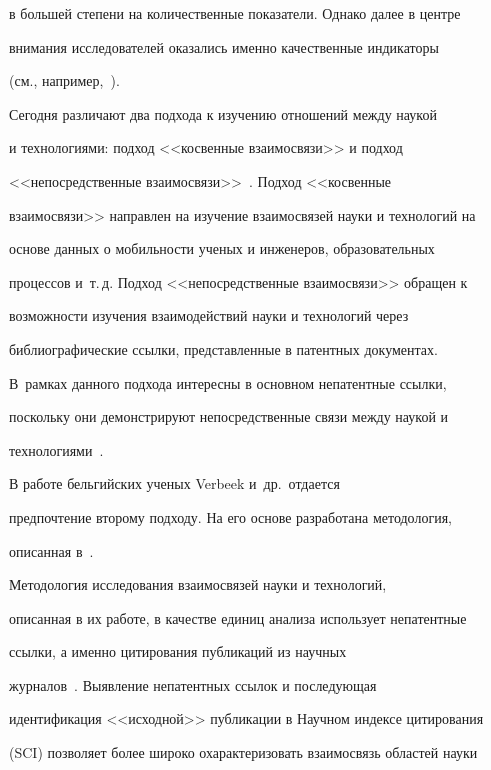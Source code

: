 в большей степени на количественные показатели. Однако далее в центре 


внимания исследователей оказались именно качественные индикаторы 


(см., например,~\cite{14-koz}).


     


     Сегодня различают два подхода к изучению отношений между наукой 


и технологиями: подход <<косвенные взаимосвязи>> и подход 


<<непосредственные взаимосвязи>>~\cite{2-koz}. Подход <<косвенные 


взаимосвязи>> направлен на изучение взаимосвязей науки и технологий на 


основе данных о мобильности ученых и инженеров, образовательных 


процессов и~т.\,д. Подход <<непосредственные взаимосвязи>> обращен к 


возможности изучения взаимодействий науки и технологий через 


библиографические ссылки, представленные в патентных документах. 


В~рамках данного подхода интересны в основном непатентные ссылки, 


поскольку они демонстрируют непосредственные связи между наукой и 


технологиями~\cite{2-koz}. 





В работе бельгийских ученых Verbeek и~др.\ отдается 


предпочтение второму подходу. На его основе разработана методология, 


описанная в~\cite{2-koz}.


     


     Методология исследования взаимосвязей науки и технологий, 


описанная в их работе, в качестве единиц анализа использует непатентные 


ссылки, а именно цитирования публикаций из научных 


     журналов~\cite{2-koz}. Выявление непатентных ссылок и последующая 


идентификация <<исходной>> публикации в Научном индексе цитирования 


(SCI) позволяет более широко охарактеризовать взаимосвязь областей науки 


